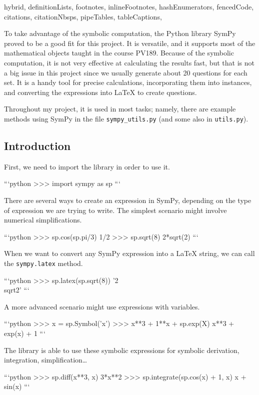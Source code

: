 \shorthandoff{-}
\begin{markdown*}{%
  hybrid,
  definitionLists,
  footnotes,
  inlineFootnotes,
  hashEnumerators,
  fencedCode,
  citations,
  citationNbsps,
  pipeTables,
  tableCaptions,
}

To take advantage of the symbolic computation, the Python library SymPy \cite{sympy} proved to be a good fit for this project. It is versatile, and it supports most of the mathematical objects taught in the course PV189. Because of the symbolic computation, it is not very effective at calculating the results fast, but that is not a big issue in this project since we usually generate about 20 questions for each set. It is a handy tool for precise calculations, incorporating them into instances, and converting the expressions into \LaTeX{} to create questions.

Throughout my project, it is used in most tasks; namely, there are example methods using SymPy in the file \verb|sympy_utils.py| (and some also in \verb|utils.py|).  

\subsection{Introduction}

First, we need to import the library in order to use it.

```python
>>> import sympy as sp
```


There are several ways to create an expression in SymPy, depending on the type of expression we are trying to write. The simplest scenario might involve numerical simplifications.

```python
>>> sp.cos(sp.pi/3)
1/2
>>> sp.sqrt(8)
2*sqrt(2)
```

When we want to convert any SymPy expression into a \LaTeX{} string, we can call the \verb|sympy.latex| method.

```python
>>> sp.latex(sp.sqrt(8))
'2 \\sqrt{2}'
```

A more advanced scenario might use expressions with variables.

```python
>>> x = sp.Symbol('x')
>>> x**3 + 1**x + sp.exp(X)
x**3 + exp(x) + 1
```

The library is able to use these symbolic expressions for symbolic derivation, integration, simplification\ldots

```python
>>> sp.diff(x**3, x)
3*x**2
>>> sp.integrate(sp.cos(x) + 1, x)
x + sin(x)
```


\end{markdown*}
